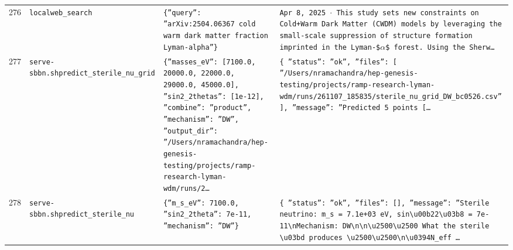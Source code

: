 \documentclass[11pt,a4paper]{article}
\begin{document}
\begin{longtable}{@{}p{}p{}p{}p{}@{}}
276 & \texttt{local}\newline\texttt{web\_\allowbreak{}search} & \texttt{\{''query'':\allowbreak{} ''arXiv:\allowbreak{}2504.06367 cold warm dark matter fraction Lyman-alpha''\}\allowbreak{}} & \texttt{Apr 8,\allowbreak{} 2025 $\cdot$ This study sets new constraints on Cold+Warm Dark Matter (CWDM)\allowbreak{} models by leveraging the small-scale suppression of structure formation imprinted in the Lyman-\$$\alpha$\$ forest. Using the Sherw\ldots{}\allowbreak{}} \\
277 & \texttt{serve-sbbn.sh}\newline\texttt{predict\_\allowbreak{}sterile\_\allowbreak{}nu\_\allowbreak{}grid} & \texttt{\{''masses\_\allowbreak{}eV'':\allowbreak{} [7100.0,\allowbreak{} 20000.0,\allowbreak{} 22000.0,\allowbreak{} 29000.0,\allowbreak{} 45000.0]\allowbreak{},\allowbreak{} ''sin2\_\allowbreak{}2thetas'':\allowbreak{} [1e-12]\allowbreak{},\allowbreak{} ''combine'':\allowbreak{} ''product'',\allowbreak{} ''mechanism'':\allowbreak{} ''DW'',\allowbreak{} ''output\_\allowbreak{}dir'':\allowbreak{} ''/\allowbreak{}Users/\allowbreak{}nramachandra/\allowbreak{}hep-genesis-testing/\allowbreak{}projects/\allowbreak{}ramp-research-lyman-wdm/\allowbreak{}runs/\allowbreak{}2\ldots{}\allowbreak{}} & \texttt{\{   ''status'':\allowbreak{} ''ok'',\allowbreak{}   ''files'':\allowbreak{} [     ''/\allowbreak{}Users/\allowbreak{}nramachandra/\allowbreak{}hep-genesis-testing/\allowbreak{}projects/\allowbreak{}ramp-research-lyman-wdm/\allowbreak{}runs/\allowbreak{}261107\_\allowbreak{}185835/\allowbreak{}sterile\_\allowbreak{}nu\_\allowbreak{}grid\_\allowbreak{}DW\_\allowbreak{}bc0526.csv''   ]\allowbreak{},\allowbreak{}   ''message'':\allowbreak{} ''Predicted 5 points [\ldots{}\allowbreak{}} \\
278 & \texttt{serve-sbbn.sh}\newline\texttt{predict\_\allowbreak{}sterile\_\allowbreak{}nu} & \texttt{\{''m\_\allowbreak{}s\_\allowbreak{}eV'':\allowbreak{} 7100.0,\allowbreak{} ''sin2\_\allowbreak{}2theta'':\allowbreak{} 7e-11,\allowbreak{} ''mechanism'':\allowbreak{} ''DW''\}\allowbreak{}} & \texttt{\{   ''status'':\allowbreak{} ''ok'',\allowbreak{}   ''files'':\allowbreak{} []\allowbreak{},\allowbreak{}   ''message'':\allowbreak{} ''Sterile neutrino:\allowbreak{} m\_\allowbreak{}s =\allowbreak{} 7.1e+03 eV,\allowbreak{} sin\textbackslash{}\allowbreak{}u00b22\textbackslash{}\allowbreak{}u03b8 =\allowbreak{} 7e-11\textbackslash{}\allowbreak{}nMechanism:\allowbreak{} DW\textbackslash{}\allowbreak{}n\textbackslash{}\allowbreak{}n\textbackslash{}\allowbreak{}u2500\textbackslash{}\allowbreak{}u2500 What the sterile \textbackslash{}\allowbreak{}u03bd produces \textbackslash{}\allowbreak{}u2500\textbackslash{}\allowbreak{}u2500\textbackslash{}\allowbreak{}n\textbackslash{}\allowbreak{}u0394N\_\allowbreak{}eff \ldots{}\allowbreak{}} \\

\end{longtable}
\end{document}

